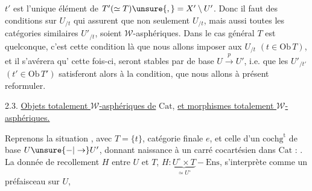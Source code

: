 
$t'$ est l'unique élément de $T'(\simeq T)\unsure{,}=X'\setminus U'$. Donc
il faut des conditions sur $U_{/t}$   qui
assurent que non seulement $U_{/t}$, mais aussi
toutes les catégories similaires $U'_{/t}$, soient
$\mathcal W$-asphériques. Dans le cas général 
$T$ est quelconque, c'est cette condition là que
nous allons imposer aux $U_{/t}$ $(t\in\mathrm{Ob}\,T)$, et il
s'avérera qu' cette fois-ci,  seront stables
par   de base $U\xrightarrow{p}U'$, i.e. que les
$U'_{/t'}$ $(t'\in\mathrm{Ob}\,T')$ satisferont alors à la  condition,
 que nous allons à présent reformuler.

2.3. \uline{Objets totalement $\mathcal W$-asphériques de} $\mathrm{Cat}$, \uline{et
morphismes totalement $\mathcal W$-asphériques.}

Reprenons la situation
, avec $T=\{t\}$, catégorie
finale  $e$,
et celle d'un $\mathrm{cochg}^{\mathrm t}$ de base $U\unsure{-|\to}U'$,
donnant naissance à un carré cocartésien dans $\mathrm{Cat}$ :
.
  La donnée de recollement $H$
entre $U$ et $T$, $H:\underbrace{U^{\circ}\times T}_{\simeq U^\circ}-\mathrm{Ens}$, 
s'interprète comme un préfaisceau sur $U$,

